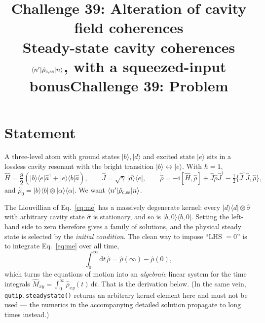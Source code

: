 \documentclass[11pt,a4paper]{article}
\title{\bfseries Challenge 39: Alteration of cavity field coherences\\[2pt]
\large Steady-state cavity coherences $\bra{n'}\hat\rho_{c,\rm ss}\ket{n}$,
with a squeezed-input bonus}
\author{}
\date{}
\title{Challenge 39: Problem}
\author{}
\newcommand{\ket}[1]{\lvert #1\rangle}
\newcommand{\bra}[1]{\langle #1\rvert}
\newcommand{\ketbra}[2]{\lvert #1\rangle\langle #2\rvert}
\newcommand{\ii}{\mathrm{i}}
\newcommand{\dd}{\mathrm{d}}
\begin{document}
\maketitle
\section{Statement}

A three-level atom with ground states $\ket b,\ket d$ and excited state $\ket e$
sits in a lossless cavity resonant with the bright transition
$\ket b\!\leftrightarrow\!\ket e$.  With $\hbar=1$,
\begin{equation}
  \hat H=\frac{g}{2}\left(\ketbra{b}{e}\hat a^{\dagger}
                         +\ketbra{e}{b}\hat a\right),
  \qquad
  \hat J=\sqrt{\gamma}\,\ketbra{d}{e},
  \qquad
  \dot{\hat\rho}=-\ii[\hat H,\hat\rho]
  +\hat J\hat\rho\hat J^{\dagger}
  -\tfrac12\{\hat J^{\dagger}\hat J,\hat\rho\},
  \label{eq:me}
\end{equation}
and $\hat\rho_0=\ketbra{b}{b}\otimes\ketbra{\alpha}{\alpha}$.  We want
$\bra{n'}\hat\rho_{c,\rm ss}\ket{n}$.

\begin{tcolorbox}[colback=red!5,colframe=red!55!black,
  title=\textbf{Careful: $\mathcal L\hat\rho=0$ does not determine the answer}]
The Liouvillian of Eq.~\eqref{eq:me} has a massively degenerate kernel: every
$\ketbra{d}{d}\otimes\hat\sigma$ with arbitrary cavity state $\hat\sigma$ is
stationary, and so is $\ketbra{b,0}{b,0}$.  Setting the left-hand side to zero
therefore gives a family of solutions, and the physical steady state is
selected by the \emph{initial condition}.  The clean way to impose ``LHS
$=0$'' is to integrate Eq.~\eqref{eq:me} over all time,
\begin{equation}
  \int_0^{\infty}\!\dd t\,\dot{\hat\rho}=\hat\rho(\infty)-\hat\rho(0),
  \label{eq:integrate}
\end{equation}
which turns the equations of motion into an \emph{algebraic} linear system for
the time integrals $\hat M_{xy}=\int_0^{\infty}\hat\rho_{xy}(t)\,\dd t$.  That
is the derivation below.  (In the same vein, \texttt{qutip.steadystate()}
returns an arbitrary kernel element here and must not be used --- the numerics
in the accompanying detailed solution propagate to long times instead.)
\end{tcolorbox}
\end{document}
